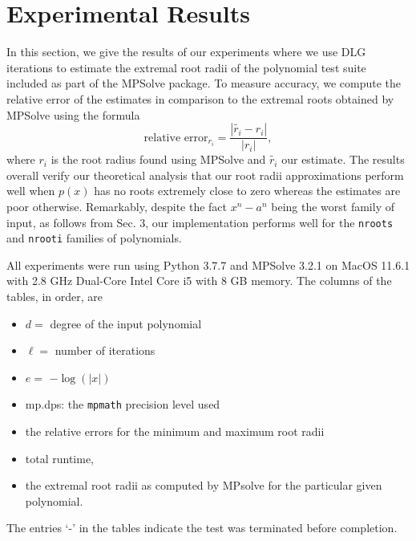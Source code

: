 \documentclass[runningheads]{llncs}
\begin{document}
\section{Experimental Results}\label{sec:exp}

In this section, we give the results of our experiments where we use DLG iterations to estimate the extremal root radii of the polynomial test suite included as part of the MPSolve package. To measure accuracy, we compute the relative error of the estimates in comparison to the extremal roots obtained by MPSolve using the formula
$$
\text{relative error}_{r_i} = \frac{|\tilde{r_i} - r_i|}{|r_i|},
$$
where $r_i$ is the root radius found using MPSolve and $\tilde{r_i}$ our estimate. The results overall verify our theoretical analysis that our root radii approximations perform well when $p(x)$ has no roots extremely close to zero whereas the estimates are poor otherwise. Remarkably, despite the fact $x^n-a^n$ being the worst family of input, as follows from Sec. 3, our implementation performs well for the \texttt{nroots} and \texttt{nrooti} families of polynomials.


All experiments were run using Python 3.7.7 and MPSolve 3.2.1 on MacOS 11.6.1 with 2.8 GHz Dual-Core Intel Core i5 with 8 GB memory. The columns of the tables, in order, are
\begin{itemize}
\item $d =$ degree of the input polynomial
\item $\ell =$ number of iterations
\item $e =$ $-\log(|x|)$
\item mp.dps: the \texttt{mpmath} precision level used
\item the relative errors for the minimum and maximum root radii
\item total runtime,
\item the extremal root radii as computed by MPsolve for the particular given polynomial.
\end{itemize}

 The entries `-' in the tables indicate the test was terminated before completion.
\end{document}
